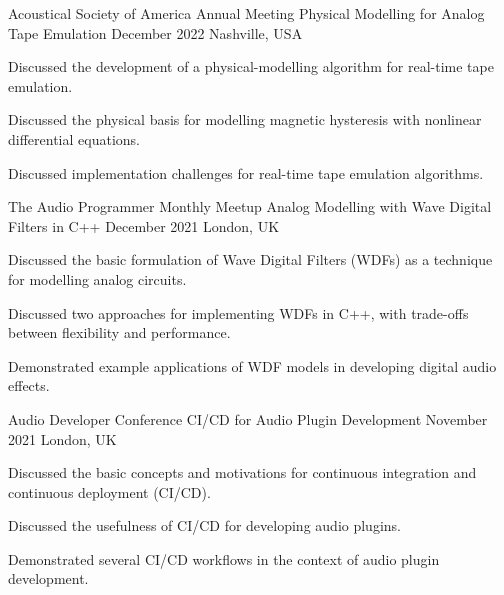 \begin{cventries}
  \cventry
    {Acoustical Society of America Annual Meeting} %
    {Physical Modelling for Analog Tape Emulation} %
    {December 2022} %
    {Nashville, USA} %
    {
      \begin{cvitems} %
        \item {Discussed the development of a physical-modelling algorithm for real-time tape emulation.}
        \item {Discussed the physical basis for modelling magnetic hysteresis with nonlinear differential equations.}
        \item {Discussed implementation challenges for real-time tape emulation algorithms.}
      \end{cvitems}
    }

  \cventry
    {The Audio Programmer Monthly Meetup} %
    {Analog Modelling with Wave Digital Filters in C++} %
    {December 2021} %
    {London, UK} %
    {
      \begin{cvitems} %
        \item {Discussed the basic formulation of Wave Digital Filters (WDFs) as a technique for modelling analog circuits.}
        \item {Discussed two approaches for implementing WDFs in C++, with trade-offs between flexibility and performance.}
        \item {Demonstrated example applications of WDF models in developing digital audio effects.}
      \end{cvitems}
    }

  \cventry
    {Audio Developer Conference} %
    {CI/CD for Audio Plugin Development} %
    {November 2021} %
    {London, UK} %
    {
      \begin{cvitems} %
        \item {Discussed the basic concepts and motivations for continuous integration and continuous deployment (CI/CD).}
        \item {Discussed the usefulness of CI/CD for developing audio plugins.}
        \item {Demonstrated several CI/CD workflows in the context of audio plugin development.}
      \end{cvitems}
    }


\end{cventries}
